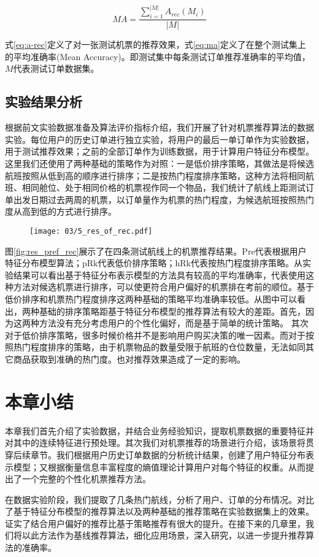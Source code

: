 \begin{equation}
\label{eq:ma}
MA = \frac{\sum_{i=1}^{|M|}A_{rec}(M_i)}{|M|}
\end{equation}\par
式\ref{eq:a-rec}定义了对一张测试机票的推荐效果，式\ref{eq:ma}定义了在整个测试集上的平均准确率(Mean Accuracy)。即测试集中每条测试订单推荐准确率的平均值，$M$代表测试订单数据集。

\subsection{实验结果分析}

根据前文实验数据准备及算法评价指标介绍，我们开展了针对机票推荐算法的数据实验。每位用户的历史订单进行独立实验，将用户的最后一单订单作为实验数据，用于测试推荐效果；之前的全部订单作为训练数据，用于计算用户特征分布模型。这里我们还使用了两种基础的策略作为对照：一是低价排序策略，其做法是将候选航班按照从低到高的顺序进行排序；二是按热门程度排序策略，这种方法将相同航班、相同舱位、处于相同价格的机票视作同一个物品，我们统计了航线上距测试订单出发日期过去两周的机票，以订单量作为机票的热门程度，为候选航班按照热门度从高到低的方式进行排序。\par

\begin{figure}
 \centering
 \texttt{[image: 03/5\_res\_of\_rec.pdf]}
\end{figure}\par

图\ref{fig:res_pref_rec}展示了在四条测试航线上的机票推荐结果。Pre代表根据用户特征分布模型算法；pRk代表低价排序策略；hRk代表按热门程度排序策略。从实验结果可以看出基于特征分布表示模型的方法具有较高的平均准确率，代表使用这种方法对候选机票进行排序，可以使更符合用户偏好的机票排在考前的顺位。基于低价排序和机票热门程度排序这两种基础的策略平均准确率较低。从图中可以看出，两种基础的排序策略距基于特征分布模型的推荐算法有较大的差距。首先，因为这两种方法没有充分考虑用户的个性化偏好，而是基于简单的统计策略。
其次对于低价排序策略，很多时候价格并不是影响用户购买决策的唯一因素。而对于按照热门程度排序的策略，由于机票物品的数量受限于航班的仓位数量，无法如同其它商品获取到准确的热门度。也对推荐效果造成了一定的影响。


\section{本章小结}
本章我们首先介绍了实验数据，并结合业务经验知识，提取机票数据的重要特征并对其中的连续特征进行预处理。其次我们对机票推荐的场景进行介绍，该场景将贯穿后续章节。我们根据用户历史订单数据的分析统计结果，创建了用户特征分布表示模型；又根据衡量信息丰富程度的熵值理论计算用户对每个特征的权重。从而提出了一个完整的个性化机票推荐方法。\par
在数据实验阶段，我们提取了几条热门航线，分析了用户、订单的分布情况。对比了基于特征分布模型的推荐算法以及两种基础的推荐策略在实验数据集上的效果。证实了结合用户偏好的推荐比基于策略推荐有很大的提升。在接下来的几章里，我们将以此方法作为基线推荐算法，细化应用场景，深入研究，以进一步提升推荐算法的准确率。
